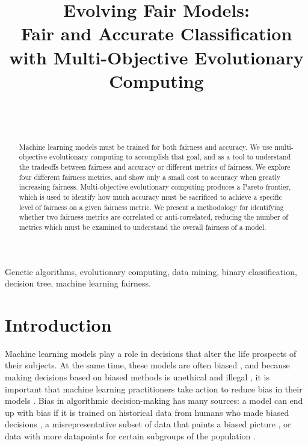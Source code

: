 \documentclass[twoside]{article}
\begin{document}
\title{\bf Evolving Fair Models: \\
Fair and Accurate Classification with Multi-Objective Evolutionary Computing}  

\author{ \hfill {}\\ 
\AND
        \hfill {}\\
}

\maketitle

\begin{abstract}
Machine learning models must be trained for both fairness and accuracy. We use multi-objective evolutionary computing to accomplish that goal, and as a tool to understand the tradeoffs between fairness and accuracy or different metrics of fairness. We explore four different fairness metrics, and show only a small cost to accuracy when greatly increasing fairness. Multi-objective evolutionary computing produces a Pareto frontier, which is used to identify how much accuracy must be sacrificed to achieve a specific level of fairness on a given fairness metric. We present a methodology for identifying whether two fairness metrics are correlated or anti-correlated, reducing the number of metrics which must be examined to understand the overall fairness of a model. 
\end{abstract}

\begin{keywords}
Genetic algorithms, 
evolutionary computing,
data mining, 
binary classification, 
decision tree, 
machine learning fairness.
\end{keywords}


\section{Introduction}

Machine learning models play a role in decisions that alter the life prospects of their subjects. At the same time, these models are often biased \citep{Angwin:2016}, and because making decisions based on biased methods is unethical and illegal \citep{Barocas:2016}, it is important that machine learning practitioners take action to reduce bias in their models \citep{Binns:2017}. Bias in algorithmic decision-making has many sources: a model can end up with bias if it is trained on historical data from humans who made biased decisions \citep{Calders:2013}, a misrepresentative subset of data that paints a biased picture \citep{Suresh:2019}, or data with more datapoints for certain subgroups of the population \citep{Torralba:2011}. 
\end{document}
